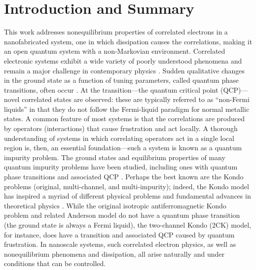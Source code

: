 \documentclass[aps,prb,reprint,floatfix,superscriptaddress,amssymb,amsmath]{revtex4-2}
\begin{document}
\date{30 September 2021; accepted version of manuscript published as \href{https://doi.org/10.1103/PhysRevB.104.165423}{Phys.\,Rev.\,B \textbf{104}, 165423 (2021)}}
\maketitle


\section{Introduction and Summary}
\label{sec:intro}

This work addresses nonequilibrium properties of correlated electrons in a nanofabricated system, one in which dissipation causes the correlations, making it an open quantum system with a non-Markovian environment. Correlated electronic systems exhibit a wide variety of 
poorly understood phenomena and remain a major challenge in contemporary physics \cite{SCEScollection17, ProcSCES2019, FuldeBook}.  Sudden qualitative changes in the ground state as a function of tuning parameters, called quantum phase transitions, often occur \cite{CarrBook,SachdevBook,VojtaPhilMag06}.  
At the transition---the quantum critical point (QCP)---novel correlated states are observed: these are typically referred to as ``non-Fermi liquids'' in that they do not follow the Fermi-liquid paradigm for normal metallic states.  
A common feature of most systems is that the correlations are produced by operators (interactions) that cause frustration 
and act locally.  A thorough understanding of systems in which correlating operators act in a single local region is, then, an essential foundation---such a system is known as a quantum impurity problem.  The ground states and equilibrium properties of many quantum impurity problems have been studied, including ones with quantum phase transitions and associated QCP \cite{VojtaPhilMag06,Vojta_critquasiEPJST15}. 
Perhaps the best known are the Kondo problems (original, multi-channel, and multi-impurity); indeed, the Kondo model has inspired a myriad of different physical problems and fundamental advances in theoretical physics \cite{Vojta_critquasiEPJST15, HewsonBook, CoxZawadowskiAdvanPhys98, ColemanBook}.  While the original isotropic antiferromagnetic Kondo problem and related Anderson model do not have a quantum phase transition (the ground state is always a Fermi liquid), the two-channel Kondo (2CK) model, for instance, does have a transition and associated QCP caused by quantum frustration. 
In nanoscale systems, such correlated electron physics, as well as nonequilibrium phenomena and dissipation, all arise naturally and under conditions that can be controlled.  
\end{document}
